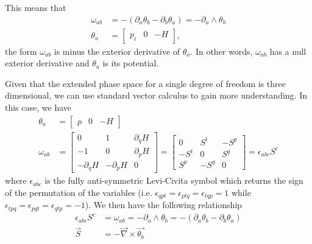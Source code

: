 This means that
\begin{equation}\label{rp-cm-lm-formPotential}
	\begin{aligned}
	\omega_{ab} &= - (\partial_a \theta_b - \partial_b \theta_a) = - \partial_a \wedge \theta_b \\
\theta_a &= \begin{bmatrix}
	p_i & 0 & - H
\end{bmatrix},
	\end{aligned}
\end{equation}
the form $\omega_{ab}$ is minus the exterior derivative of $\theta_a$. In other words, $\omega_{ab}$ has a null exterior derivative and $\theta_a$ is its potential.

Given that the extended phase space for a single degree of freedom is three dimensional, we can use standard vector calculus to gain more understanding. In this case, we have
\begin{equation}
	\begin{aligned}
	\theta_a &= \begin{bmatrix}
		p & 0 & - H
	\end{bmatrix} \\
\omega_{ab} &= \left[\begin{array}{ccc}
	0 & 1 & \partial_{q} H \\
	- 1 & 0 & \partial_{p} H \\
	- \partial_{q} H & -\partial_{p} H & 0
\end{array} \right]
= \left[\begin{array}{ccc}
	0 & S^t & - S^p \\
	- S^t & 0 & S^q \\
	S^p & - S^q & 0
\end{array} \right] = \epsilon_{abc}S^c
	\end{aligned}
\end{equation}
where $\epsilon_{abc}$ is the fully anti-symmetric Levi-Civita symbol which returns the sign of the permutation of the variables (i.e. $\epsilon_{qpt} = \epsilon_{ptq} = \epsilon_{tqp} = 1$ while $\epsilon_{tpq} = \epsilon_{pqt} = \epsilon_{qtp} = -1$). We then have the following relationship
\begin{equation}\label{rp-cm-lm-displacementFormComponents}
	\begin{aligned}
	\epsilon_{abc}S^c &= \omega_{ab} = - \partial_a \wedge \theta_b = - (\partial_a \theta_b - \partial_b \theta_a) \\
	\vec{S} &= - \vec{\nabla} \times \vec{\theta_b} \\
	\end{aligned}
\end{equation}
